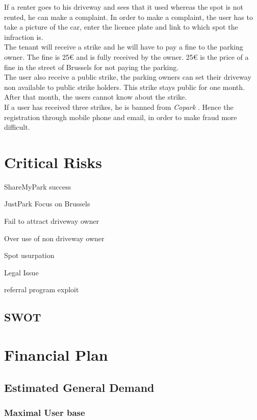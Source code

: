 \documentclass[12pt,a4paper,oneside]{book}
\newcommand{\bp}{\textit{Copark }}
\begin{document}
If a renter goes to his driveway and sees that it used whereas the spot is not rented, he can make a complaint. In order to make a complaint, the user has to take a picture of the car, enter the licence plate and link to which spot the infraction is.\\
The tenant will receive a strike and he will have to pay a fine to the parking owner. The fine is 25\euro{} and is fully received by the owner. 25\euro{} is the price of a fine in the street of Brussels for not paying the parking.\\
The user also receive a public strike, the parking owners can set their driveway non available to public strike holders. This strike stays public for one month. After that month, the users cannot know about the strike.\\
If a user has received three strikes, he is banned from \bp. Hence the registration through mobile phone and email, in order to make fraud more difficult.

\chapter{Critical Risks}

ShareMyPark success

JustPark Focus on Brussels

Fail to attract driveway owner

Over use of non driveway owner

Spot usurpation

Legal Issue

referral program exploit


\section{SWOT}

\chapter{Financial Plan}

\section{Estimated General Demand}

\subsection{Maximal User base}
\end{document}
